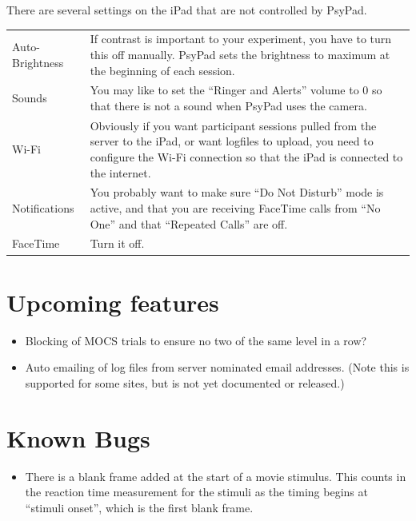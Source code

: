 \documentclass{article}
\begin{document}
There are several settings on the iPad that are not controlled by PsyPad.

\begin{tabular}{lp{10cm}}

Auto-Brightness & If contrast is important to your experiment, you have to turn this off manually.
PsyPad sets the brightness to maximum at the beginning of each session.\\

Sounds & You may like to set the ``Ringer and Alerts'' volume to 0 so that there is not a sound when
PsyPad uses the camera.\\

Wi-Fi & Obviously if you want participant sessions pulled from the server to the iPad, or want logfiles
to upload, you need to configure the Wi-Fi connection so that the iPad is connected to the internet.\\

Notifications & You probably want to make sure ``Do Not Disturb'' mode is active, and that you are
receiving FaceTime calls from ``No One'' and that ``Repeated Calls'' are off. \\

FaceTime & Turn it off. \\

\end{tabular}

\section{Upcoming features}

\begin{itemize}
\item Blocking of MOCS trials to ensure no two of the same level in a row?
\item Auto emailing of log files from server nominated email addresses.
      (Note this is supported for some sites, but is not yet documented or
       released.)
\end{itemize}

\section{Known Bugs}

\begin{itemize}
\item There is a blank frame added at the start of a movie 
stimulus. This counts in the reaction 
time measurement for the stimuli as the timing begins at ``stimuli onset'', 
which is the first blank frame.
\end{itemize}
\end{document}
